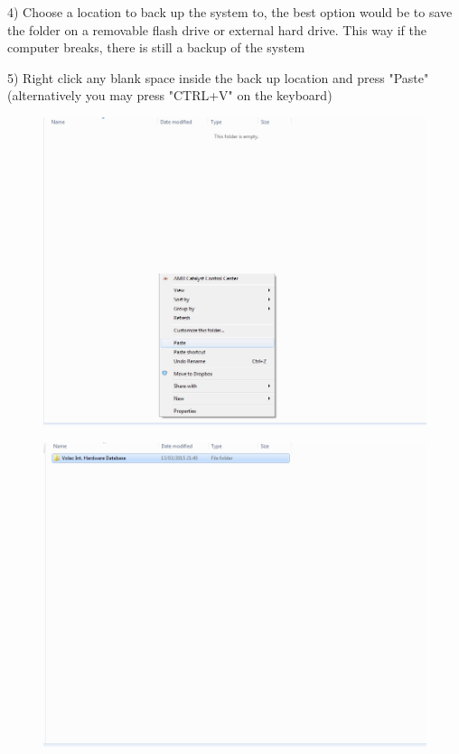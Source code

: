 4) Choose a location to back up the system to, the best option would be to save the folder on a removable flash drive or external hard drive. This way if the computer breaks, there is still a backup of the system


5) Right click any blank space inside the back up location and press "Paste" (alternatively you may press "CTRL+V" on the keyboard)

\begin{figure}[H]
    \includegraphics[width=\textwidth]{./Manual/Images/backup4.png}
\end{figure}

\begin{figure}[H]
    \includegraphics[width=\textwidth]{./Manual/Images/backup5.png}
\end{figure}

